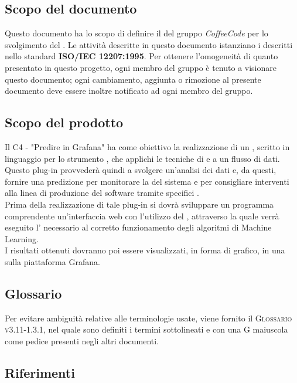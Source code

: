 \documentclass[../norme-di-progetto.tex]{subfiles}
\begin{document}
\subsection{Scopo del documento}
Questo documento ha lo scopo di definire il  del gruppo \emph{CoffeeCode} per lo svolgimento del .
Le attività descritte in questo documento istanziano i  descritti nello standard \textbf{ISO/IEC 12207:1995}. Per ottenere l'omogeneità di quanto presentato in questo progetto, ogni membro del gruppo è tenuto a visionare questo documento; ogni cambiamento, aggiunta o rimozione al presente documento deve essere inoltre notificato ad ogni membro del gruppo.

\subsection{Scopo del prodotto}
Il  C4 - "Predire in Grafana" ha come obiettivo la realizzazione di un , scritto in linguaggio  per lo strumento  , che applichi le tecniche di   e  a un flusso di dati. Questo plug-in provvederà quindi a svolgere un'analisi dei dati e, da questi, fornire una predizione per monitorare la  del sistema e per consigliare interventi alla linea di produzione del software tramite specifici . \\
Prima della realizzazione di tale plug-in si dovrà sviluppare un programma comprendente un'interfaccia web con l'utilizzo del  , attraverso la quale verrà eseguito l' necessario al corretto funzionamento degli algoritmi di Machine Learning. \\
I risultati ottenuti dovranno poi essere visualizzati, in forma di grafico, in una  sulla piattaforma Grafana.

\subsection{Glossario}
Per evitare ambiguità relative alle terminologie usate, viene fornito il \textsc{Glossario v3.11-1.3.1}, nel quale sono definiti i termini sottolineati e con una G maiuscola come pedice presenti negli altri documenti.

\subsection{Riferimenti}
\end{document}
